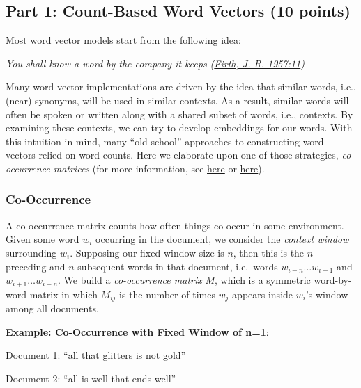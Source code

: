 \documentclass[11pt]{article}
\begin{document}
    \subsection{Part 1: Count-Based Word Vectors (10
points)}\label{part-1-count-based-word-vectors-10-points}

Most word vector models start from the following idea:

\emph{You shall know a word by the company it keeps
(\href{https://en.wikipedia.org/wiki/John_Rupert_Firth}{Firth, J. R.
1957:11})}

Many word vector implementations are driven by the idea that similar
words, i.e., (near) synonyms, will be used in similar contexts. As a
result, similar words will often be spoken or written along with a
shared subset of words, i.e., contexts. By examining these contexts, we
can try to develop embeddings for our words. With this intuition in
mind, many ``old school'' approaches to constructing word vectors relied
on word counts. Here we elaborate upon one of those strategies,
\emph{co-occurrence matrices} (for more information, see
\href{https://web.stanford.edu/%7Ejurafsky/slp3/6.pdf}{here} or
\href{https://web.archive.org/web/20190530091127/https://medium.com/data-science-group-iitr/word-embedding-2d05d270b285}{here}).

    \subsubsection{Co-Occurrence}\label{co-occurrence}

A co-occurrence matrix counts how often things co-occur in some
environment. Given some word \(w_i\) occurring in the document, we
consider the \emph{context window} surrounding \(w_i\). Supposing our
fixed window size is \(n\), then this is the \(n\) preceding and \(n\)
subsequent words in that document, i.e.~words \(w_{i-n} \dots w_{i-1}\)
and \(w_{i+1} \dots w_{i+n}\). We build a \emph{co-occurrence matrix}
\(M\), which is a symmetric word-by-word matrix in which \(M_{ij}\) is
the number of times \(w_j\) appears inside \(w_i\)'s window among all
documents.

\textbf{Example: Co-Occurrence with Fixed Window of n=1}:

Document 1: ``all that glitters is not gold''

Document 2: ``all is well that ends well''
\end{document}
